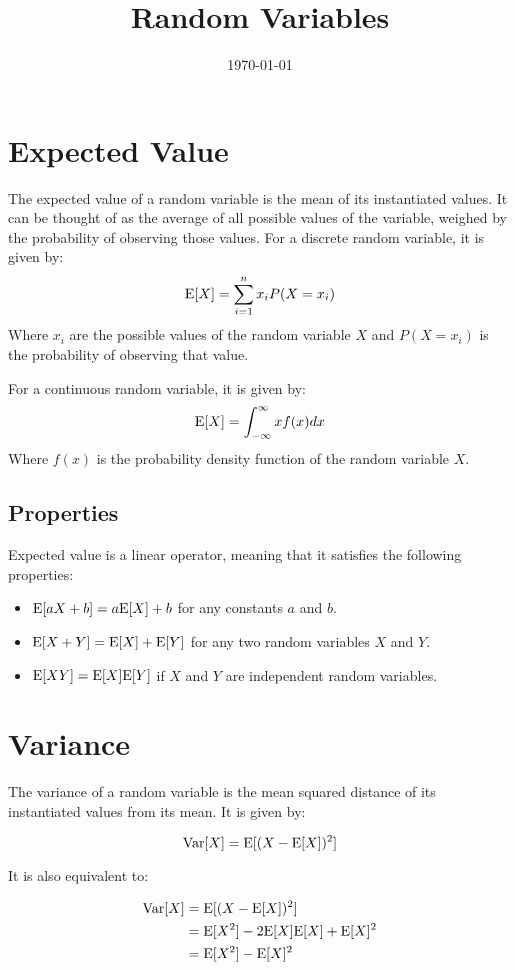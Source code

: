 \documentclass[12pt]{article}
\title{Random Variables}
\date{\today}
\begin{document}
\maketitle

\section{Expected Value}

The expected value of a random variable is the mean of its instantiated values.
It can be thought of as the average of all possible values of the variable, weighed by the probability of observing those values.
For a discrete random variable, it is given by:
$$ \mathrm{E}[X] = \sum_{i=1}^{n} x_i P(X=x_i) $$
Where $x_i$ are the possible values of the random variable $X$ and $P(X=x_i)$ is the probability of observing that value.

For a continuous random variable, it is given by:
$$ \mathrm{E}[X] = \int_{-\infty}^{\infty} x f(x) dx $$
Where $f(x)$ is the probability density function of the random variable $X$.

\subsection{Properties}

Expected value is a linear operator, meaning that it satisfies the following properties:
\begin{itemize}
    \item $\mathrm{E}[aX + b] = a \mathrm{E}[X] + b$ for any constants $a$ and $b$.
    \item $\mathrm{E}[X + Y] = \mathrm{E}[X] + \mathrm{E}[Y]$ for any two random variables $X$ and $Y$.
    \item $\mathrm{E}[XY] = \mathrm{E}[X]\mathrm{E}[Y]$ if $X$ and $Y$ are independent random variables.
\end{itemize}

\section{Variance}

The variance of a random variable is the mean squared distance of its instantiated values from its mean.
It is given by:

$$ \mathrm{Var}[X] = \mathrm{E}[ (X - \mathrm{E}[X])^2] $$

It is also equivalent to:

\begin{align*}
    \mathrm{Var}[X] &= \mathrm{E}[ (X - \mathrm{E}[X])^2] \\
    &= \mathrm{E}[X^2] - 2 \mathrm{E}[X] \mathrm{E}[X] + \mathrm{E}[X]^2 \\
    &= \mathrm{E}[X^2] - \mathrm{E}[X]^2
\end{align*}
\end{document}
